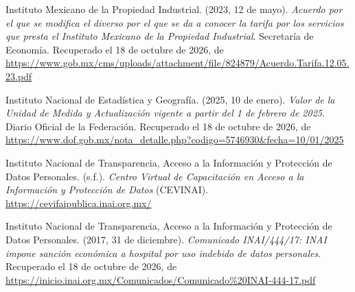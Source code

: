 \documentclass[12pt, a4paper]{article}
\begin{document}
\begin{list}{}{\setlength{\leftmargin}{1.27cm}\setlength{\itemindent}{-1.27cm}%
  \setlength{\labelwidth}{0pt}\setlength{\labelsep}{0pt}\setlength{\itemsep}{6pt}}
\item Instituto Mexicano de la Propiedad Industrial. (2023, 12 de
  mayo). \textit{Acuerdo por el que se modifica el diverso por el que
  se da a conocer la tarifa por los servicios que presta el Instituto
  Mexicano de la Propiedad Industrial}. Secretaría de Economía. Recuperado el 18 de octubre de 2026, de \url{https://www.gob.mx/cms/uploads/attachment/file/824879/Acuerdo.Tarifa.12.05.23.pdf}
 

\item Instituto Nacional de Estadística y Geografía. (2025,
  10 de enero). \textit{Valor de la Unidad de Medida y
  Actualización vigente a partir del 1 de febrero de 2025}.
  Diario Oficial de la Federación.
  Recuperado el 18 de octubre de 2026, de \url{https://www.dof.gob.mx/nota_detalle.php?codigo=5746930&fecha=10/01/2025}


\item Instituto Nacional de Transparencia, Acceso a la Información
  y Protección de Datos Personales. (s.f.). \textit{Centro Virtual de
  Capacitación en Acceso a la Información y Protección de Datos}
  (CEVINAI). \url{https://cevifaipublica.inai.org.mx/}
 

\item Instituto Nacional de Transparencia, Acceso a la Información
  y Protección de Datos Personales. (2017, 31 de diciembre).
  \textit{Comunicado INAI/444/17: INAI impone sanción económica a
  hospital por uso indebido de datos personales}. Recuperado el 18 de octubre de 2026, de \url{https://inicio.inai.org.mx/Comunicados/Comunicado%20INAI-444-17.pdf}
 
  

\end{list}
\end{document}
